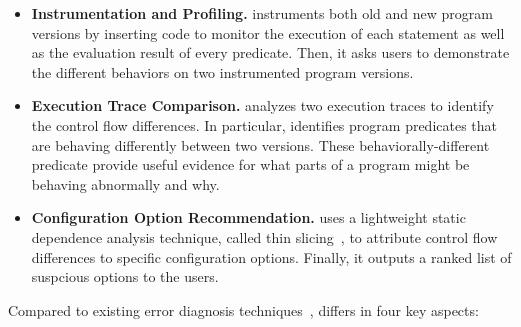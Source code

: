 \vspace{-2mm}

\begin{itemize}

\item \textbf{Instrumentation and Profiling.} \ourtool
instruments both old and new program versions by inserting
code to monitor the execution of each statement as well as the
evaluation result of every predicate. Then, it asks users to
demonstrate the different behaviors on two instrumented
program versions. 

\item \textbf{Execution Trace Comparison.}
\ourtool analyzes two execution traces to identify
the control flow differences. In particular, \ourtool
identifies program predicates that are behaving
differently between two versions. These
behaviorally-different predicate 
provide useful evidence for what parts of a program might
be behaving abnormally
and why.

\item \textbf{Configuration Option Recommendation.} 
\ourtool uses a lightweight static dependence analysis
technique, called thin slicing~\cite{Sridharan:2007}, to attribute
control flow differences to specific configuration options.
Finally, it outputs a ranked list of suspcious options to the users.


\end{itemize}

Compared to existing error diagnosis
techniques~\cite{Wang:2004:AMT, Rabkin:2011:PPC, Whitaker:2004:CDS,
Zhang:2013:ADS, Attariyan:2010:ACT, Su:2007:AIC, Attariyan:2008:UCD, xray
}, \ourtool differs in four
key aspects:

